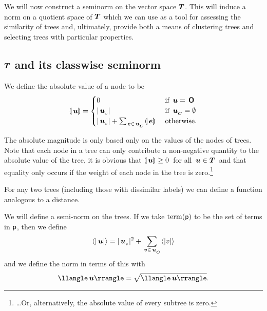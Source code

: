 We will now construct a seminorm on the vector space
$\boldsymbol{T}$. This will induce a norm on a quotient space of $\boldsymbol{T}$ which we
can use as a tool for assessing the similarity of trees and,
ultimately, provide both a means of clustering trees and selecting
trees with particular properties.

\subsection{$\boldsymbol{T}$ and its classwise seminorm}
\begin{definition}\label{absolute-mag}
 We define the absolute value of a node to be
\begin{align*}
\llparenthesis{\,\boldsymbol{u}}\rrparenthesis = \begin{cases}
  0 & \text{ if } \,\boldsymbol{u} = \,\boldsymbol{\mathsf{O}} \\
  \lvert{{\,\boldsymbol{u}}_{{}_{v}}}\rvert & \text{ if }{\,\boldsymbol{u}}_{{}_{\boldsymbol{C}}} = \emptyset \\
  \lvert{{\,\boldsymbol{u}}_{{}_{v}}}\rvert + \sum_{\,\boldsymbol{e}\in{\,\boldsymbol{u}}_{{}_{\boldsymbol{C}}}}\llparenthesis{\,\boldsymbol{e}}\rrparenthesis & \text{ otherwise.}
\end{cases}
\end{align*}
\end{definition}
The absolute magnitude is only based only on the values of the
nodes of trees. %
Note that each node in a tree can only contribute a non-negative
quantity to the absolute value of the tree, it is obvious that
\(\llparenthesis{\,\boldsymbol{u}}\rrparenthesis \geq 0\)\ for all \(\,\boldsymbol{u} \in \boldsymbol{T}\)\ and that
equality only occurs if the weight of each node in the tree 
is zero.\footnote{\ldots Or, alternatively, the absolute value of every subtree is zero.}

For any two trees (including those with dissimilar labels) we can
define a function analogous to a distance.

\begin{definition}\label{treenorm}
  We will define a semi-norm on the trees. 
  If we take $\operatorname{term}(\mathsf{p})$ to be the set of terms in $\mathsf{p}$,
  then we define
  \begin{equation}
    \langle\rvert{\,\boldsymbol{u}}\lvert\rangle={\lvert{{\,\boldsymbol{u}}_{{}_{v}}}\rvert^2 + \sum_{\substack{\,\boldsymbol{v}\in{\,\boldsymbol{u}}_{{}_{\boldsymbol{C}}}}} \langle\rvert{v}\lvert\rangle}
  \end{equation}
  and we define the norm in terms of this with
  \begin{equation}
    \nnorm{\node{u}}=\sqrt{\nnorm{\node{u}}}.
  \end{equation}
\end{definition}

